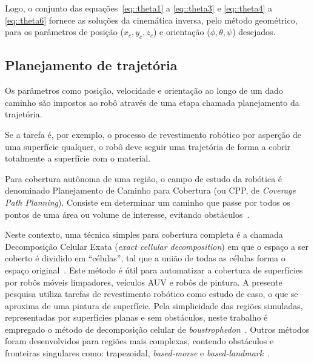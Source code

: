 Logo, o conjunto das equações~\ref{eq::theta1} a \ref{eq::theta3} e
\ref{eq::theta4} a \ref{eq::theta6} fornece as soluções da cinemática inversa,
pelo método geométrico, para os parâmetros de posição ($x_c, y_c, z_c$) e
orientação ($\phi, \theta, \psi$) desejados. 


\subsection{ Planejamento de trajetória} \label{sec::plan_traj}

Os parâmetros como posição, velocidade e orientação ao longo de um dado caminho
são impostos ao robô através de uma etapa chamada planejamento da trajetória.


Se a tarefa é, por exemplo, o processo de revestimento robótico por asperção de
uma superfície qualquer, o robô deve seguir uma trajetória de forma a cobrir
totalmente a superfície com o material.

Para cobertura autônoma de uma região, o campo de estudo da robótica é
denominado Planejamento de Caminho para Cobertura (ou CPP, de \textit{Coverage Path
Planning}). Consiste em determinar um caminho que passe por todos os
pontos de uma área ou volume de interesse, evitando
obstáculos~\cite{galceran2013survey}.

Neste contexto, uma técnica simples para cobertura completa é a chamada
Decomposição Celular Exata (\textit{exact cellular decomposition}) em que o
espaço a ser coberto é dividido em ``células'', tal que a união de todas as
células forma o espaço original~\cite{latombe1991exact}. Este método é útil para
automatizar a cobertura de superfícies por robôs móveis limpadores, veículos AUV
e robôs de pintura. A presente pesquisa utiliza tarefas de revestimento robótico
como estudo de caso, o que se aproxima de uma pintura de superfície.
Pela simplicidade das regiões simuladas, representadas por superfícies planas e
sem obstáculos, neste trabalho é empregado o método de decomposição celular de
\textit{boustrophedon}~\cite{choset2000coverage}. Outros métodos foram
desenvolvidos para regiões mais complexas, contendo obstáculos e fronteiras
singulares como: trapezoidal, \textit{based-morse} e
\textit{based-landmark}~\cite{galceran2013survey}.

